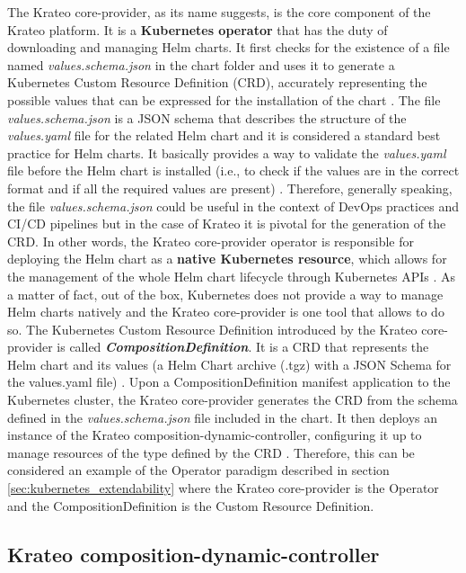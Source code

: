 The Krateo core-provider, as its name suggests, is the core component of the Krateo platform.
It is a \textbf{Kubernetes operator} that has the duty of downloading and managing Helm charts. 
It first checks for the existence of a file named \textit{values.schema.json} in the chart folder and uses it to generate a Kubernetes Custom Resource Definition (CRD), accurately representing the possible values that can be expressed for the installation of the chart \cite{krateo_core_provider}.
The file \textit{values.schema.json} is a JSON schema that describes the structure of the \textit{values.yaml} file for the related Helm chart and it is considered a standard best practice for Helm charts. 
It basically provides a way to validate the \textit{values.yaml} file before the Helm chart is installed (i.e., to check if the values are in the correct format and if all the required values are present) \cite{krateo_core_provider}.
Therefore, generally speaking, the file \textit{values.schema.json} could be useful in the context of DevOps practices and CI/CD pipelines but in the case of Krateo it is pivotal for the generation of the CRD.
In other words, the Krateo core-provider operator is responsible for deploying the Helm chart as a \textbf{native Kubernetes resource}, which allows for the management of the whole Helm chart lifecycle through Kubernetes APIs \cite{krateo_core_provider}.
As a matter of fact, out of the box, Kubernetes does not provide a way to manage Helm charts natively and the Krateo core-provider is one tool that allows to do so.
The Kubernetes Custom Resource Definition introduced by the Krateo core-provider is called \textbf{\textit{CompositionDefinition}}. 
It is a CRD that represents the Helm chart and its values (a Helm Chart archive (.tgz) with a JSON Schema for the values.yaml file) \cite{krateo_core_provider}.
Upon a CompositionDefinition manifest application to the Kubernetes cluster, the Krateo core-provider generates the CRD from the schema defined in the \textit{values.schema.json} file included in the chart. 
It then deploys an instance of the Krateo composition-dynamic-controller, configuring it up to manage resources of the type defined by the CRD \cite{krateo_core_provider}.
Therefore, this can be considered an example of the Operator paradigm described in section \ref{sec:kubernetes_extendability} where the Krateo core-provider is the Operator and the CompositionDefinition is the Custom Resource Definition.

\subsection{Krateo composition-dynamic-controller}


